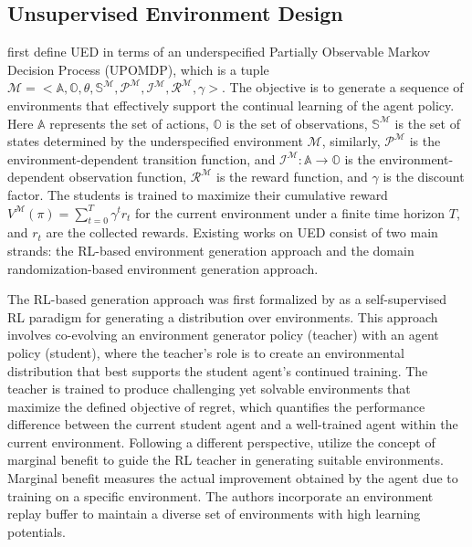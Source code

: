 \documentclass{article}
\newcommand\sA{\mathbb{A}}
\newcommand\sS{\mathbb{S}}
\newcommand\sO{\mathbb{O}}
\begin{document}
\subsection{Unsupervised Environment Design} \label{subsec:ued}

\citet{dennis2020emergent} first define UED in terms of an underspecified Partially Observable Markov Decision Process (UPOMDP), which is a tuple
$\mathcal{M}=<\sA,\sO,\mathbb{\theta},\sS^{\mathcal{M}},\mathcal{P}^{\mathcal{M}},\mathcal{I}^{\mathcal{M}},\mathcal{R}^{\mathcal{M}},\gamma>$. The objective is to generate a sequence of environments that effectively support the continual learning of the agent policy. Here  $\sA$ represents the set of actions, $\sO$ is the set of observations, $\sS^{\mathcal{M}}$ is the set of states determined by the underspecified environment  $\mathcal{M}$, similarly, $\mathcal{P}^{\mathcal{M}}$ is the environment-dependent transition function, and $\mathcal{I}^{\mathcal{M}}:\sA \rightarrow \sO$ is the environment-dependent observation function, $\mathcal{R}^{\mathcal{M}}$ is the reward function, and $\gamma$ is the discount factor. The students is trained to maximize their cumulative reward $V^{\mathcal{M}}(\pi) = \sum_{t=0}^T \gamma^t r_t$ for the current environment under a finite time horizon $T$, and $r_t$ are the collected rewards. Existing works on UED consist of two main strands: the RL-based environment generation approach and the domain randomization-based environment generation approach. 

The RL-based generation approach was first formalized by \citet{dennis2020emergent} as a self-supervised RL paradigm for generating a distribution over environments. This approach involves co-evolving an environment generator policy (teacher) with an agent policy (student), where the teacher's role is to create an environmental distribution that best supports the student agent's continued training. The teacher is trained to produce challenging yet solvable environments that maximize the defined objective of regret, which quantifies the performance difference between the current student agent and a well-trained agent within the current environment.  Following a different perspective, \citet{li2023diversity} utilize the concept of marginal benefit to guide the RL teacher in generating suitable environments. Marginal benefit measures the actual improvement obtained by the agent due to training on a specific environment. The authors incorporate an environment replay buffer to maintain a diverse set of environments with high learning potentials.
\end{document}
